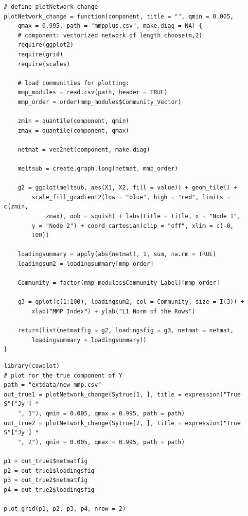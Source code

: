 \begin{verbatim}
# define plotNetwork_change
plotNetwork_change = function(component, title = "", qmin = 0.005,
    qmax = 0.995, path = "mmpplus.csv", make.diag = NA) {
    # component: vectorized network of length choose(n,2)
    require(ggplot2)
    require(grid)
    require(scales)

    # load communities for plotting:
    mmp_modules = read.csv(path, header = TRUE)
    mmp_order = order(mmp_modules$Community_Vector)

    zmin = quantile(component, qmin)
    zmax = quantile(component, qmax)

    netmat = vec2net(component, make.diag)

    meltsub = create.graph.long(netmat, mmp_order)

    g2 = ggplot(meltsub, aes(X1, X2, fill = value)) + geom_tile() +
        scale_fill_gradient2(low = "blue", high = "red", limits = c(zmin,
            zmax), oob = squish) + labs(title = title, x = "Node 1",
        y = "Node 2") + coord_cartesian(clip = "off", xlim = c(-0,
        100))

    loadingsummary = apply(abs(netmat), 1, sum, na.rm = TRUE)
    loadingsum2 = loadingsummary[mmp_order]

    Community = factor(mmp_modules$Community_Label)[mmp_order]

    g3 = qplot(c(1:100), loadingsum2, col = Community, size = I(3)) +
        xlab("MMP Index") + ylab("L1 Norm of the Rows")

    return(list(netmatfig = g2, loadingsfig = g3, netmat = netmat,
        loadingsummary = loadingsummary))
}
\end{verbatim}

\begin{verbatim}
library(cowplot)
# plot for the true component of Y
path = "extdata/new_mmp.csv"
out_true1 = plotNetwork_change(Sytrue[1, ], title = expression("True S"["Jy"] *
    ", 1"), qmin = 0.005, qmax = 0.995, path = path)
out_true2 = plotNetwork_change(Sytrue[2, ], title = expression("True S"["Jy"] *
    ", 2"), qmin = 0.005, qmax = 0.995, path = path)

p1 = out_true1$netmatfig
p2 = out_true1$loadingsfig
p3 = out_true2$netmatfig
p4 = out_true2$loadingsfig

plot_grid(p1, p2, p3, p4, nrow = 2)
\end{verbatim}

